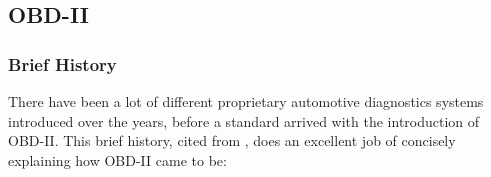 \subsection{OBD-II}
\label{sec:obd}

\subsubsection{Brief History}
\label{subsec:obd:brief_history} 

\cite{ISO15031-1,ISO15031-2,ISO15031-3,ISO15031-4,ISO15031-5,ISO15031-6,ISO15031-7}

There have been a lot of different proprietary automotive diagnostics systems introduced over the years, before a standard arrived with the introduction of OBD-II. This brief history, cited from \cite{OBDhistory}, does an excellent job of concisely explaining how OBD-II came to be:

